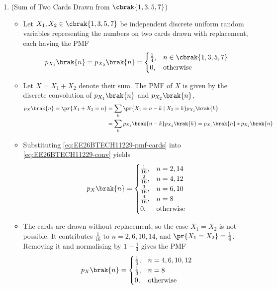 \begin{enumerate}[label=\thesubsection.\arabic*, ref=\thesubsection.\theenumi]
\item (Sum of Two Cards Drawn from $\cbrak{1, 3, 5, 7}$)
\begin{itemize}
\item Let $X_1, X_2 \in \cbrak{1, 3, 5, 7}$ be independent discrete uniform random variables representing the numbers on two cards drawn with replacement, each having the PMF
\begin{align}
	p_{X_1}\brak{n} = p_{X_2}\brak{n} = \begin{cases}
		\frac{1}{4}, & n \in \cbrak{1, 3, 5, 7}
		\\
		0, & \text{otherwise}
	\end{cases}
	\label{eq:EE26BTECH11229-pmf-cards}
\end{align}
\item Let $X = X_1 + X_2$ denote their sum. The PMF of $X$ is given by the discrete convolution of $p_{X_1}\brak{n}$ and $p_{X_2}\brak{n}$,
\begin{align}
	p_X\brak{n} = \pr{X_1 + X_2 = n} &= \sum_{k}\pr{X_1 = n - k \mid X_2 = k}p_{X_2}\brak{k}
	\\
	&= \sum_{k}p_{X_1}\brak{n - k}p_{X_2}\brak{k} = p_{X_1}\brak{n} * p_{X_2}\brak{n}
	\label{eq:EE26BTECH11229-conv}
\end{align}
\item Substituting \eqref{eq:EE26BTECH11229-pmf-cards} into \eqref{eq:EE26BTECH11229-conv} yields
\begin{align}
	p_X\brak{n} = \begin{cases}
		\frac{1}{16}, & n = 2, 14
		\\
		\frac{2}{16}, & n = 4, 12
		\\
		\frac{3}{16}, & n = 6, 10
		\\
		\frac{4}{16}, & n = 8
		\\
		0, & \text{otherwise}
	\end{cases}
\end{align}
\item The cards are drawn without replacement, so the case $X_1 = X_2$ is not possible. It contributes $\frac{1}{16}$ to $n = 2, 6, 10, 14$, and $\pr{X_1 = X_2} = \frac{1}{4}$. Removing it and normalising by $1 - \frac{1}{4}$ gives the PMF
\begin{align}
	p_X\brak{n} = \begin{cases}
		\frac{1}{6}, & n = 4, 6, 10, 12
		\\
		\frac{1}{3}, & n = 8
		\\
		0, & \text{otherwise}
	\end{cases}

\end{align}
\end{itemize}
\end{enumerate}
